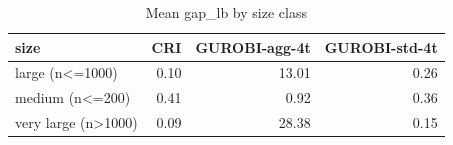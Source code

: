 \begin{table}[htbp]
\centering
\small
\caption{Mean gap\_lb by size class}
\label{tab:E7_gurobi_threads_b10_by_size}
\begin{tabular}{lrrr}
\toprule
size & CRI & GUROBI-agg-4t & GUROBI-std-4t \\
\midrule
large (n<=1000) & 0.10 & 13.01 & 0.26 \\
medium (n<=200) & 0.41 & 0.92 & 0.36 \\
very large (n>1000) & 0.09 & 28.38 & 0.15 \\
\bottomrule
\end{tabular}
\end{table}
